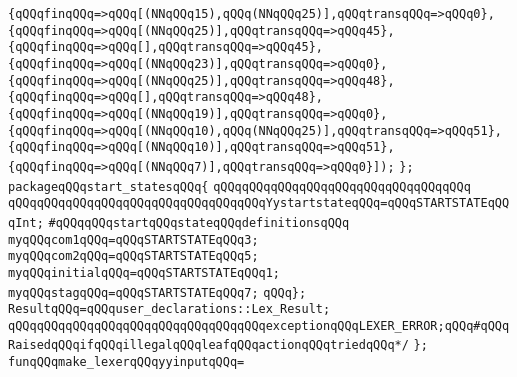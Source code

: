 \verb|{qQQqfinqQQq=>qQQq[(NNqQQq15),qQQq(NNqQQq25)],qQQqtransqQQq=>qQQq0},|\newline
\verb|{qQQqfinqQQq=>qQQq[(NNqQQq25)],qQQqtransqQQq=>qQQq45},|\newline
\verb|{qQQqfinqQQq=>qQQq[],qQQqtransqQQq=>qQQq45},|\newline
\verb|{qQQqfinqQQq=>qQQq[(NNqQQq23)],qQQqtransqQQq=>qQQq0},|\newline
\verb|{qQQqfinqQQq=>qQQq[(NNqQQq25)],qQQqtransqQQq=>qQQq48},|\newline
\verb|{qQQqfinqQQq=>qQQq[],qQQqtransqQQq=>qQQq48},|\newline
\verb|{qQQqfinqQQq=>qQQq[(NNqQQq19)],qQQqtransqQQq=>qQQq0},|\newline
\verb|{qQQqfinqQQq=>qQQq[(NNqQQq10),qQQq(NNqQQq25)],qQQqtransqQQq=>qQQq51},|\newline
\verb|{qQQqfinqQQq=>qQQq[(NNqQQq10)],qQQqtransqQQq=>qQQq51},|\newline
\verb|{qQQqfinqQQq=>qQQq[(NNqQQq7)],qQQqtransqQQq=>qQQq0}]);|\newline
\verb|};|\newline
\verb|packageqQQqstart_statesqQQq{|\newline
\verb|qQQqqQQqqQQqqQQqqQQqqQQqqQQqqQQqqQQq|\newline
\verb|qQQqqQQqqQQqqQQqqQQqqQQqqQQqqQQqqQQqYystartstateqQQq=qQQqSTARTSTATEqQQqInt;|\newline
\newline
\verb|#qQQqqQQqstartqQQqstateqQQqdefinitionsqQQq|\newline
\newline
\verb|myqQQqcom1qQQq=qQQqSTARTSTATEqQQq3;|\newline
\verb|myqQQqcom2qQQq=qQQqSTARTSTATEqQQq5;|\newline
\verb|myqQQqinitialqQQq=qQQqSTARTSTATEqQQq1;|\newline
\verb|myqQQqstagqQQq=qQQqSTARTSTATEqQQq7;|\newline
\newline
\verb|qQQq};|\newline
\verb|ResultqQQq=qQQquser_declarations::Lex_Result;|\newline
\verb|qQQqqQQqqQQqqQQqqQQqqQQqqQQqqQQqqQQqexceptionqQQqLEXER_ERROR;qQQq#qQQqRaisedqQQqifqQQqillegalqQQqleafqQQqactionqQQqtriedqQQq*/|\newline
\verb|};|\newline
\newline
\verb|funqQQqmake_lexerqQQqyyinputqQQq=|\newline

